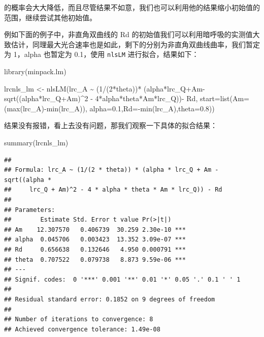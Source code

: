 \documentclass[
]{krantz}
\makeatletter
\newenvironment{Shaded}{\begin{snugshade}}{\end{snugshade}}
\newcommand{\AttributeTok}[1]{\textcolor[rgb]{0.77,0.63,0.00}{#1}}
\newcommand{\DecValTok}[1]{\textcolor[rgb]{0.00,0.00,0.81}{#1}}
\newcommand{\FloatTok}[1]{\textcolor[rgb]{0.00,0.00,0.81}{#1}}
\newcommand{\FunctionTok}[1]{\textcolor[rgb]{0.00,0.00,0.00}{#1}}
\newcommand{\NormalTok}[1]{#1}
\newcommand{\OtherTok}[1]{\textcolor[rgb]{0.56,0.35,0.01}{#1}}
\newcommand{\SpecialCharTok}[1]{\textcolor[rgb]{0.00,0.00,0.00}{#1}}
\newenvironment{kframe}{%
\medskip{}
\setlength{\fboxsep}{.8em}
 \def\at@end@of@kframe{}%
 \ifinner\ifhmode%
  \def\at@end@of@kframe{\end{minipage}}%
  \begin{minipage}{\columnwidth}%
 \fi\fi%
 \def\FrameCommand##1{\hskip\@totalleftmargin \hskip-\fboxsep
 \colorbox{shadecolor}{##1}\hskip-\fboxsep
     \hskip-\linewidth \hskip-\@totalleftmargin \hskip\columnwidth}%
 \MakeFramed {\advance\hsize-\width
   \@totalleftmargin\z@ \linewidth\hsize
   \@setminipage}}%
 {\par\unskip\endMakeFramed%
 \at@end@of@kframe}
\renewenvironment{Shaded}{\begin{kframe}}{\end{kframe}}
\makeatother
\begin{document}
的概率会大大降低，而且尽管结果不如意，我们也可以利用他的结果缩小初始值的范围，继续尝试其他初始值。

例如下面的例子中，非直角双曲线的 Rd 的初始值我们可以利用暗呼吸的实测值大致估计，同理最大光合速率也是如此，剩下的分别为非直角双曲线曲率，我们暂定为 1，alpha 也暂定为 0.1，使用 \texttt{nlsLM} 进行拟合，结果如下：

\begin{Shaded}
\begin{Highlighting}[]
\FunctionTok{library}\NormalTok{(minpack.lm)}

\NormalTok{lrcnls\_lm }\OtherTok{\textless{}{-}} \FunctionTok{nlsLM}\NormalTok{(lrc\_A }\SpecialCharTok{\textasciitilde{}}\NormalTok{ (}\DecValTok{1}\SpecialCharTok{/}\NormalTok{(}\DecValTok{2}\SpecialCharTok{*}\NormalTok{theta))}\SpecialCharTok{*}
\NormalTok{        (alpha}\SpecialCharTok{*}\NormalTok{lrc\_Q}\SpecialCharTok{+}\NormalTok{Am}\SpecialCharTok{{-}}\FunctionTok{sqrt}\NormalTok{((alpha}\SpecialCharTok{*}\NormalTok{lrc\_Q}\SpecialCharTok{+}\NormalTok{Am)}\SpecialCharTok{\^{}}\DecValTok{2} \SpecialCharTok{{-}} 
        \DecValTok{4}\SpecialCharTok{*}\NormalTok{alpha}\SpecialCharTok{*}\NormalTok{theta}\SpecialCharTok{*}\NormalTok{Am}\SpecialCharTok{*}\NormalTok{lrc\_Q))}\SpecialCharTok{{-}} 
\NormalTok{        Rd, }\AttributeTok{start=}\FunctionTok{list}\NormalTok{(}\AttributeTok{Am=}\NormalTok{(}\FunctionTok{max}\NormalTok{(lrc\_A)}\SpecialCharTok{{-}}\FunctionTok{min}\NormalTok{(lrc\_A)),}
        \AttributeTok{alpha=}\FloatTok{0.1}\NormalTok{,}\AttributeTok{Rd=}\SpecialCharTok{{-}}\FunctionTok{min}\NormalTok{(lrc\_A),}\AttributeTok{theta=}\FloatTok{0.8}\NormalTok{)) }
\end{Highlighting}
\end{Shaded}

结果没有报错，看上去没有问题，那我们观察一下具体的拟合结果：

\begin{Shaded}
\begin{Highlighting}[]
\FunctionTok{summary}\NormalTok{(lrcnls\_lm)}
\end{Highlighting}
\end{Shaded}

\begin{verbatim}
## 
## Formula: lrc_A ~ (1/(2 * theta)) * (alpha * lrc_Q + Am - sqrt((alpha * 
##     lrc_Q + Am)^2 - 4 * alpha * theta * Am * lrc_Q)) - Rd
## 
## Parameters:
##        Estimate Std. Error t value Pr(>|t|)    
## Am    12.307570   0.406739  30.259 2.30e-10 ***
## alpha  0.045706   0.003423  13.352 3.09e-07 ***
## Rd     0.656638   0.132646   4.950 0.000791 ***
## theta  0.707522   0.079738   8.873 9.59e-06 ***
## ---
## Signif. codes:  0 '***' 0.001 '**' 0.01 '*' 0.05 '.' 0.1 ' ' 1
## 
## Residual standard error: 0.1852 on 9 degrees of freedom
## 
## Number of iterations to convergence: 8 
## Achieved convergence tolerance: 1.49e-08
\end{verbatim}
\end{document}
